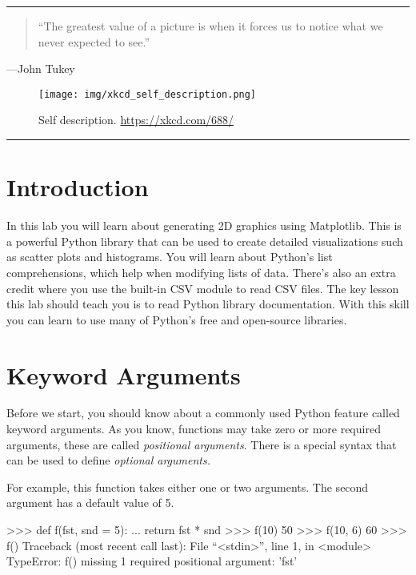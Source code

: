 \documentclass[11pt]{cselabheader}
\title{\thetitle}
\author{\theauthor}
\date{NMT Department of Computer Science and Engineering}
\begin{document}
\maketitle
\hrule

\begin{quote}
``The greatest value of a picture is when it forces us to notice what we
never expected to see.''
\end{quote}
\begin{flushright}
---John Tukey
\end{flushright}

\begin{figure}[H]
  \centering
  \texttt{[image: img/xkcd\_self\_description.png]}
  \caption{Self description. \url{https://xkcd.com/688/}}
\end{figure}

\hrule

\pagebreak
\tableofcontents

\section*{Introduction}
In this lab you will learn about generating 2D graphics using
Matplotlib.  This is a powerful Python library that can be used to
create detailed visualizations such as scatter plots and
histograms. You will learn about Python's list comprehensions, which
help when modifying lists of data.  There's also an extra credit where
you use the built-in CSV module to read CSV files.  The key lesson
this lab should teach you is to read Python library
documentation. With this skill you can learn to use many of Python's
free and open-source libraries.

\pagebreak
{}
\section{Keyword Arguments}
Before we start, you should know about a commonly used Python feature
called keyword arguments. As you know, functions may take zero or more
required arguments, these are called \textsl{positional arguments}.
There is a special syntax that can be used to define \textsl{optional
arguments.}

For example, this function takes either one or two arguments. The second
argument has a default value of 5.

\begin{pyconcode}
>>> def f(fst, snd = 5):
...    return fst * snd
>>> f(10)
50
>>> f(10, 6)
60
>>> f()
Traceback (most recent call last):
  File ``<stdin>'', line 1, in <module>
TypeError: f() missing 1 required positional argument: 'fst'
\end{pyconcode}
\end{document}
